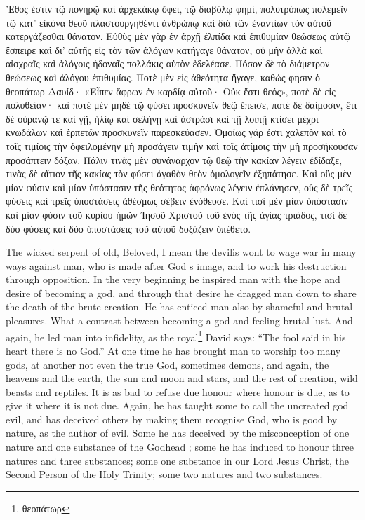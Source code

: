 \documentclass[10pt]{book}
\newcommand{\switchGreek}[1][]{\selectlanguage{polutonikogreek} \switchcolumn*[#1]}
\newcommand{\switchEnglish}{\selectlanguage{english} \switchcolumn}
\begin{document}
\begin{paracol}{2}
\switchGreek

Ἔθος ἐστὶν τῷ πονηρῷ καὶ ἀρχεκάκῳ ὄφει, τῷ διαβόλῳ φημί, πολυτρόπως πολεμεῖν
τῷ κατ’ εἰκόνα θεοῦ πλαστουργηθέντι ἀνθρώπῳ καὶ διὰ τῶν ἐναντίων τὸν αὐτοῦ
κατεργάζεσθαι θάνατον. Εὐθὺς μὲν γὰρ ἐν ἀρχῇ ἐλπίδα καὶ ἐπιθυμίαν θεώσεως αὐτῷ
ἔσπειρε καὶ δι’ αὐτῆς εἰς τὸν τῶν ἀλόγων κατήγαγε θάνατον, οὐ μὴν ἀλλὰ καὶ
αἰσχραῖς καὶ ἀλόγοις ἡδοναῖς πολλάκις αὐτὸν ἐδελέασε. Πόσον δὲ τὸ διάμετρον
θεώσεως καὶ ἀλόγου ἐπιθυμίας. Ποτὲ μὲν εἰς ἀθεότητα ἤγαγε, καθώς φησιν ὁ
θεοπάτωρ Δαυίδ· «Εἶπεν ἄφρων ἐν καρδίᾳ αὐτοῦ· Οὐκ ἔστι θεός», ποτὲ δὲ εἰς
πολυθεΐαν· καὶ ποτὲ μὲν μηδὲ τῷ φύσει προσκυνεῖν θεῷ ἔπεισε, ποτὲ δὲ δαίμοσιν,
ἔτι δὲ οὐρανῷ τε καὶ γῇ, ἡλίῳ καὶ σελήνῃ καὶ ἀστράσι καὶ τῇ λοιπῇ κτίσει μέχρι
κνωδάλων καὶ ἑρπετῶν προσκυνεῖν παρεσκεύασεν. Ὁμοίως γάρ ἐστι χαλεπὸν καὶ τὸ
τοῖς τιμίοις τὴν ὀφειλομένην μὴ προσάγειν τιμὴν καὶ τοῖς ἀτίμοις τὴν μὴ
προσήκουσαν προσάπτειν δόξαν. Πάλιν τινὰς μὲν συνάναρχον τῷ θεῷ τὴν κακίαν
λέγειν ἐδίδαξε, τινὰς δὲ αἴτιον τῆς κακίας τὸν φύσει ἀγαθὸν θεὸν ὁμολογεῖν
ἐξηπάτησε. Καὶ οὓς μὲν μίαν φύσιν καὶ μίαν ὑπόστασιν τῆς θεότητος ἀφρόνως
λέγειν ἐπλάνησεν, οὓς δὲ τρεῖς φύσεις καὶ τρεῖς ὑποστάσεις ἀθέσμως σέβειν
ἐνόθευσε. Καὶ τισὶ μὲν μίαν ὑπόστασιν καὶ μίαν φύσιν τοῦ κυρίου ἡμῶν Ἰησοῦ
Χριστοῦ τοῦ ἑνὸς τῆς ἁγίας τριάδος, τισὶ δὲ δύο φύσεις καὶ δύο ὑποστάσεις τοῦ
αὐτοῦ δοξάζειν ὑπέθετο.

\switchEnglish

The wicked serpent of old, Beloved, I mean 
the devil\textemdash is wont to wage war in many ways 
against man, who is made after God s image, 
and to work his destruction through opposition. 
In the very beginning he inspired man with the 
hope and desire of becoming a god, and through 
that desire he dragged man down to share the 
death of the brute creation. He has enticed 
man also by shameful and brutal pleasures. 
What a contrast between becoming a god and 
feeling brutal lust. And again, he led man 
into infidelity, as the royal\footnote{θεοπάτωρ} David 
says: ``The fool said in his heart there is no 
God.'' At one time he has brought man to 
worship too many gods, at another not even 
the true God, sometimes demons, and again, 
the heavens and the earth, the sun and moon 
and stars, and the rest of creation, wild beasts 
and reptiles. It is as bad to refuse due honour 
where honour is due, as to give it where it is 
not due. Again, he has taught some to call 
the uncreated god evil, and has deceived others 
by making them recognise God, who is good 
by nature, as the author of evil. Some he has 
deceived by the misconception of one nature 
and one substance of the Godhead ; some he 
has induced to honour three natures and three 
substances; some one substance in our Lord 
Jesus Christ, the Second Person of the Holy 
Trinity; some two natures and two substances. 


\end{paracol}
\end{document}
